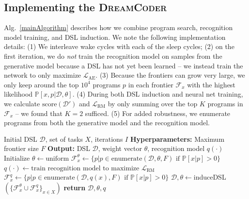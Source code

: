 \documentclass{article}
\newcommand{\system}{\textsc{DreamCoder}~}
\newcommand{\probability}{\mathds{P}} %
\begin{document}
\subsection{Implementing the \system}

Alg.~\ref{mainAlgorithm} describes how we combine program search,
recognition model training, and DSL induction.
We note the following implementation details:
(1) We interleave wake cycles with each of the sleep cycles;
(2) on the first iteration, we do \emph{not} train the recognition model on samples from
the generative model because a DSL has not yet been learned --
we instead train the network to only maximize $\mathcal{L}_{\text{AE}}$.
(3) Because the frontiers can grow very large,
we only keep around the top $10^4$ programs $p$ in each frontier $\mathcal{F}_x$
with the highest likelihood $\probability[x,p|\mathcal{D},\theta]$.
(4) During both DSL induction and neural net training, we calculate $\text{score}(\mathcal{D}')$ and $\mathcal{L}_{\text{RM}}$
by only summing over the top $K$
programs in $\mathcal{F}_x$ -- we found that $K = 2$ sufficed.
(5) For added robustness, we enumerate programs from both the generative model and the recognition model.

\begin{algorithm}[tb]
   \caption{The \system Algorithm}
   \label{mainAlgorithm}
   \begin{algorithmic}
      Initial DSL $\mathcal{D}$, set of tasks $X$, iterations $I$
     \STATE \textbf{Hyperparameters:} Maximum frontier size $F$
     \STATE \textbf{Output:} DSL $\mathcal{D}$, weight vector $\theta$, recognition model $q(\cdot)$
     \STATE Initialize $\theta\gets \text{uniform}$ %
     \STATE  $\mathcal{F}^{\theta}_x\gets \{p| p\in \text{enumerate}(\mathcal{D},\theta,F)\text{ if }\probability[x|p] > 0\}$
     \STATE $q(\cdot )\gets \text{train recognition model to maximize }\mathcal{L}_{\text{RM}}$
     \STATE  $\mathcal{F}^{q}_x\gets\{p|p\in \text{enumerate}(\mathcal{D},q(x),F)\text{ if }\probability[x|p] > 0\}$
     \STATE $\mathcal{D},\theta\gets $induceDSL$(\{\mathcal{F}^{\theta}_x\cup\mathcal{F}^{q}_x\}_{x\in X})$
      \ENDFOR
 \STATE \textbf{return} $\mathcal{D},\theta,q$
\end{algorithmic}
\end{algorithm}
\end{document}
